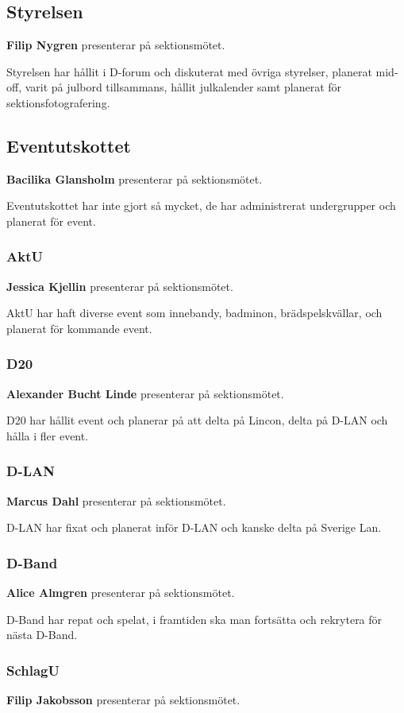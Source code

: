 \documentclass[../protokoll-vintermote-2024.tex]{subfiles}
\begin{document}
\subsection{Styrelsen}
\textbf{Filip Nygren} presenterar på sektionsmötet. 
 
Styrelsen har hållit i D-forum och diskuterat med övriga styrelser, planerat mid-off, varit på julbord tillsammans, hållit julkalender samt planerat för sektionsfotografering.

\subsection{Eventutskottet}
\textbf{Bacilika Glansholm} presenterar på sektionsmötet.

Eventutskottet har inte gjort så mycket, de har administrerat undergrupper och planerat för event.

\subsubsection{AktU}
\textbf{Jessica Kjellin} presenterar på sektionsmötet.

AktU har haft diverse event som innebandy, badminon, brädspelskvällar, och planerat för kommande event.

\subsubsection{D20}
\textbf{Alexander Bucht Linde} presenterar på sektionsmötet. 

D20 har hållit event och planerar på att delta på Lincon, delta på D-LAN och hålla i fler event.

\subsubsection{D-LAN}
\textbf{Marcus Dahl} presenterar på sektionsmötet. 

D-LAN har fixat och planerat inför D-LAN och kanske delta på Sverige Lan.

\subsubsection{D-Band}
\textbf{Alice Almgren} presenterar på sektionsmötet. 

D-Band har repat och spelat, i framtiden ska man fortsätta och rekrytera för nästa D-Band.

\subsubsection{SchlagU}
\textbf{Filip Jakobsson} presenterar på sektionsmötet. 
\end{document}
